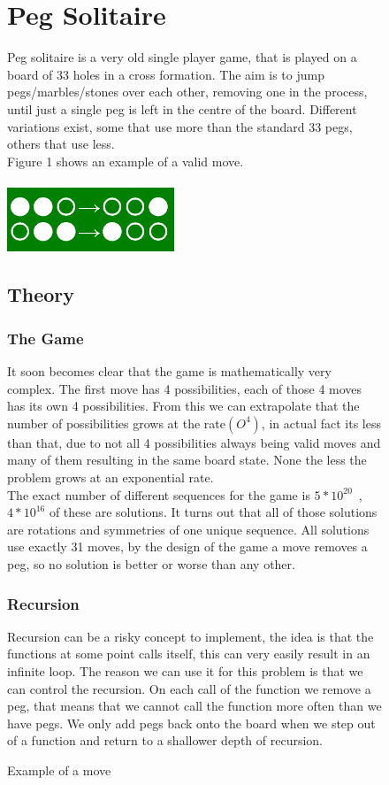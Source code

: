 \documentclass[11pt]{article}
\begin{document}
\begin{figure}
\section{Peg Solitaire}
Peg solitaire is a very old single player game, that is played on a board of 33 holes in a cross formation. The aim is to jump pegs/marbles/stones over each other, removing one in the process, until just a single peg is left in the centre of the board. Different variations exist, some that use more than the standard 33 pegs, others that use less.\\
Figure 1 shows an example of a valid move.\\\\
\includegraphics[width=5cm]{1}
\caption{Example of a move} 
\label{fig: 1}
\subsection{Theory}
\subsubsection*{The Game}
It soon becomes clear that the game is mathematically very complex. The first move has 4 possibilities, each of those 4 moves has its own 4 possibilities. From this we can extrapolate that the number of possibilities grows at the rate$(O^4)$, in actual fact its less than that, due to not all 4 possibilities always being valid moves and many of them resulting in the same board state. None the less the problem grows at an exponential rate.\\
The exact number of different sequences for the game is $5*10^{20}$~\cite{durango},  $4*10^{16}$ of these are solutions. It turns out that all of those solutions are rotations and symmetries of one unique sequence. 
All solutions use exactly 31 moves, by the design of the game a move removes a peg, so no solution is better or worse than any other.

\subsubsection*{Recursion}
Recursion can be a risky concept to implement, the idea is that the functions at some point calls itself, this can very easily result in an infinite loop. The reason we can use it for this problem is that we can control the recursion. On each call of the function we remove a peg, that means that we cannot call the function more often than we have pegs. We only add pegs back onto the board when we step out of a function and return to a shallower depth of recursion.
\end{figure}
\end{document}
